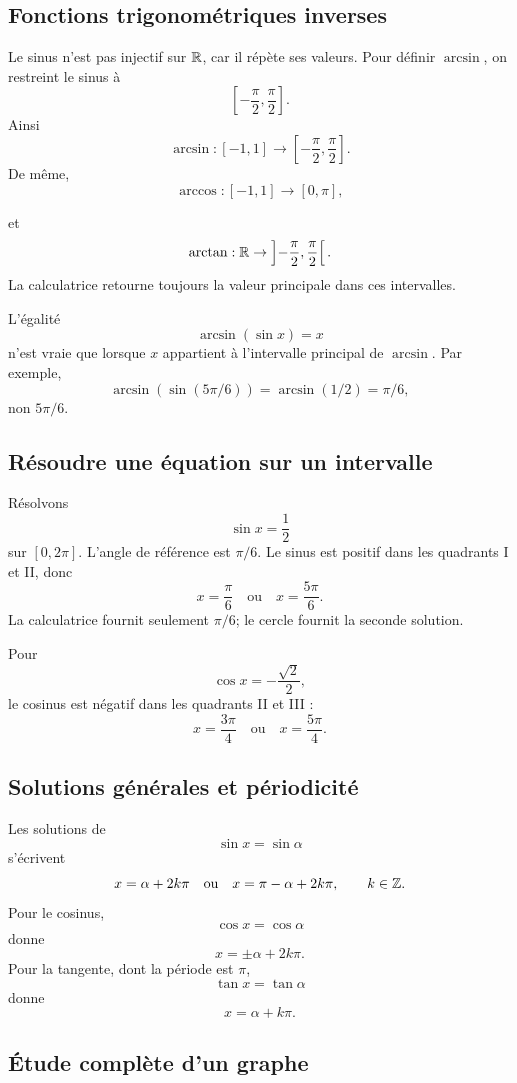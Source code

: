 \subsection{Fonctions trigonométriques inverses}

Le sinus n'est pas injectif sur $\mathbb{R}$, car il répète ses valeurs. Pour définir $\arcsin$, on restreint le sinus à
\[
\left[-\frac\pi2,\frac\pi2\right].
\]
Ainsi
\[
\arcsin:[-1,1]\to\left[-\frac\pi2,\frac\pi2\right].
\]
De même,
\[
\arccos:[-1,1]\to[0,\pi],
\]

et
\[
\arctan:\mathbb{R}\to\left]-\frac\pi2,\frac\pi2\right[.
\]
La calculatrice retourne toujours la valeur principale dans ces intervalles.

\begin{warningbox}
L'égalité
\[
\arcsin(\sin x)=x
\]
n'est vraie que lorsque $x$ appartient à l'intervalle principal de $\arcsin$. Par exemple,
\[
\arcsin(\sin(5\pi/6))=\arcsin(1/2)=\pi/6,
\]
non $5\pi/6$.
\end{warningbox}

\subsection{Résoudre une équation sur un intervalle}

Résolvons
\[
\sin x=\frac12
\]
sur $[0,2\pi]$. L'angle de référence est $\pi/6$. Le sinus est positif dans les quadrants I et II, donc
\[
x=\frac\pi6
\quad\text{ou}\quad
x=\frac{5\pi}{6}.
\]
La calculatrice fournit seulement $\pi/6$; le cercle fournit la seconde solution.

Pour
\[
\cos x=-\frac{\sqrt2}{2},
\]
le cosinus est négatif dans les quadrants II et III :
\[
x=\frac{3\pi}{4}
\quad\text{ou}\quad
x=\frac{5\pi}{4}.
\]

\subsection{Solutions générales et périodicité}

Les solutions de
\[
\sin x=\sin\alpha
\]
s'écrivent
\[
x=\alpha+2k\pi
\quad\text{ou}\quad
x=\pi-\alpha+2k\pi,
\qquad k\in\mathbb{Z}.
\]
Pour le cosinus,
\[
\cos x=\cos\alpha
\]
donne
\[
x=\pm\alpha+2k\pi.
\]
Pour la tangente, dont la période est $\pi$,
\[
\tan x=\tan\alpha
\]
donne
\[
x=\alpha+k\pi.
\]

\subsection{Étude complète d'un graphe}

